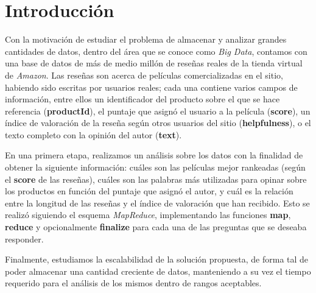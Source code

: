 \section{Introducción}

Con la motivación de estudiar el problema de almacenar y analizar grandes cantidades de datos, dentro del área que se conoce como \emph{Big Data}, contamos con una base de datos de más de medio millón de reseñas reales de la tienda virtual de \emph{Amazon}. Las reseñas son acerca de películas comercializadas en el sitio, habiendo sido escritas por usuarios reales; cada una contiene varios campos de información, entre ellos un identificador del producto sobre el que se hace referencia (\textbf{productId}), el puntaje que asignó el usuario a la película (\textbf{score}), un índice de valoración de la reseña según otros usuarios del sitio (\textbf{helpfulness}), o el texto completo con la opinión del autor (\textbf{text}).

En una primera etapa, realizamos un análisis sobre los datos con la finalidad de obtener la siguiente información: cuáles son las películas mejor rankeadas (según el \textbf{score} de las reseñas), cuáles son las palabras más utilizadas para opinar sobre los productos en función del puntaje que asignó el autor, y cuál es la relación entre la longitud de las reseñas y el índice de valoración que han recibido. Esto se realizó siguiendo el esquema \emph{MapReduce}, implementando las funciones \textbf{map}, \textbf{reduce} y opcionalmente \textbf{finalize} para cada una de las preguntas que se deseaba responder.

Finalmente, estudiamos la escalabilidad de la solución propuesta, de forma tal de poder almacenar una cantidad creciente de datos, manteniendo a su vez el tiempo requerido para el análisis de los mismos dentro de rangos aceptables.